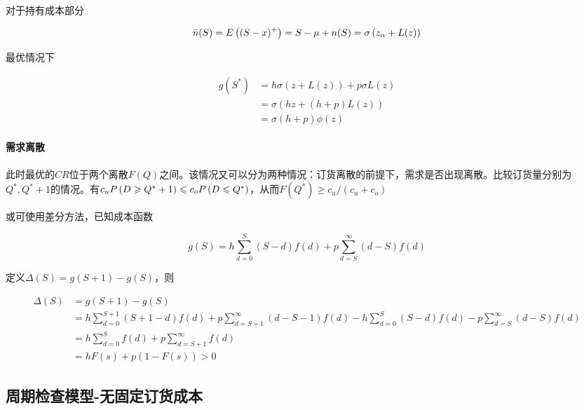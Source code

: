 \documentclass{../notes}
\begin{document}
    对于持有成本部分

    \begin{equation*}
        \bar n(S) = E\left((S-x)^+\right) = S-\mu+n(S) = \sigma \left(z_\alpha + L(z)\right)
    \end{equation*}

    最优情况下

    \begin{equation}
        \begin{aligned}
            g\left(S^*\right) &= h\sigma \left(z+ L(z)\right) + p\sigma L(z) \\
            &= \sigma\left(hz + (h + p)L(z)\right) \\
            &= \sigma(h + p)\phi(z)
        \end{aligned}
    \end{equation}

    \separate[0.5pt]

    \paragraph*{需求离散} 此时最优的$CR$位于两个离散$F(Q)$之间。该情况又可以分为两种情况：订货离散的前提下，需求是否出现离散。比较订货量分别为$Q^*, Q^*+1$的情况。有$c_uP\left(D\geqslant Q^*+1\right)\leqslant c_oP\left(D\leqslant Q^*\right)$，从而$F(Q^*)\geq c_u/(c_u+c_o)$

    或可使用差分方法，已知成本函数

    \begin{equation}
        g(S) = h\sum_{d=0}^S (S-d)f(d) + p\sum_{d=S}^\infty (d-S)f(d)
    \end{equation}

    定义$\Delta(S) = g(S+1) - g(S)$，则

    \begin{equation*}
        \begin{aligned}
            \Delta(S) &= g(S+1) - g(S) \\
            &=h\sum_{d=0}^{S+1} (S + 1 - d)f(d) + p\sum_{d=S+1}^\infty (d- S - 1)f(d) - h\sum_{d=0}^S (S-d)f(d) - p\sum_{d=S}^\infty (d-S)f(d) \\
            &= h\sum_{d=0}^Sf(d) + p\sum_{d=S + 1}^\infty f(d) \\
            &= hF(s) + p(1-F(s)) > 0
        \end{aligned}
    \end{equation*}

    \subsection*{周期检查模型-无固定订货成本}
\end{document}
